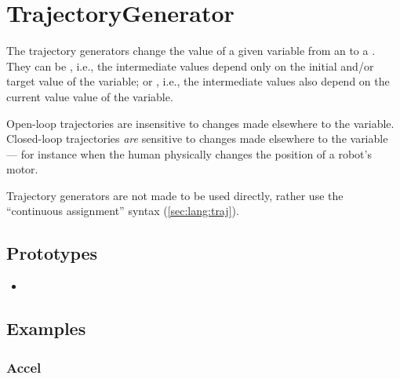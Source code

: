 \section{TrajectoryGenerator}

The trajectory generators change the value of a given variable from an
 to a .  They can be
, i.e., the intermediate values depend only on the
initial and/or target value of the variable; or ,
i.e., the intermediate values also depend on the current value value
of the variable.

Open-loop trajectories are insensitive to changes made elsewhere to
the variable.  Closed-loop trajectories \emph{are} sensitive to
changes made elsewhere to the variable --- for instance when the human
physically changes the position of a robot's motor.

Trajectory generators are not made to be used directly, rather use the
``continuous assignment'' syntax (\autoref{sec:lang:traj}).


\subsection{Prototypes}
\begin{itemize}
\item {}
\end{itemize}

\subsection{Examples}
\label{sec:traj:examples}

\let\subsubsectionOrig\subsubsection
\renewcommand{\subsubsection}[1]
{%
  \subsubsectionOrig{\label{sec:traj:#1}#1}%
  \index{#1@\lstinline{#1}}%
}

\subsubsection{Accel}

